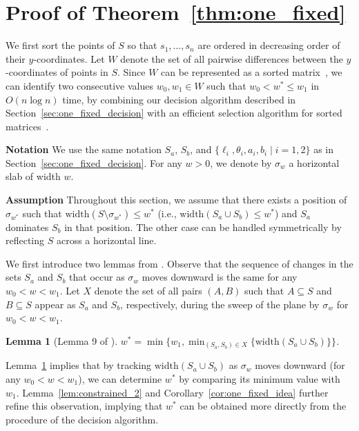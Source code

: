 \documentclass[10pt,a4paper]{article}
\newtheorem{lemma}[theorem]{Lemma}
\theoremstyle{star}
\theoremstyle{claimstar}
\newcommand{\width}{\ensuremath{\mathrm{width}}}
\begin{document}
\section{Proof of Theorem~\ref{thm:one_fixed}}
\label{sec:one_fixed_appendix}



We first sort the points of $S$ so that $s_1, \ldots, s_n$ are ordered in decreasing order of their $y$-coordinates.
Let $W$ denote the set of all pairwise differences between the $y$-coordinates of points in $S$.
Since $W$ can be represented as a sorted matrix~\cite{frederickson1982complexity}, we can identify two consecutive values $w_0, w_1 \in W$ such that $w_0 < w^* \le w_1$ in $O(n \log n)$ time, by combining our decision algorithm described in Section~\ref{sec:one_fixed_decision} with an efficient selection algorithm for sorted matrices~\cite{frederickson1984generalized}.

\textbf{Notation} We use the same notation $S_a$, $S_b$, and $\{\ell_i, \theta_i, a_i, b_i \mid i = 1, 2\}$ as in Section~\ref{sec:one_fixed_decision}.
For any $w > 0$, we denote by $\sigma_w$ a horizontal slab of width $w$.

\textbf{Assumption}
Throughout this section, we assume that there exists a position of $\sigma_{w^*}$ such that $\width(S \setminus \sigma_{w^*}) \le w^*$  (i.e., $\width(S_a\cup S_b) \le w^*$) and $S_a$ dominates $S_b$ in that position.
The other case can be handled symmetrically by reflecting $S$ across a horizontal line.

We first introduce two lemmas from \cite{ahn2024constrained}.
Observe that the sequence of changes in the sets $S_a$ and $S_b$ that occur as $\sigma_w$ moves downward is the same for any $w_0 < w < w_1$.
Let $X$ denote the set of all pairs $(A, B)$ such that $A \subseteq S$ and $B \subseteq S$ appear as $S_a$ and $S_b$, respectively, during the sweep of the plane by $\sigma_w$ for $w_0 < w < w_1$.


\begin{lemma}[Lemma 9 of \cite{ahn2024constrained}]
    \label{lem:constrained_1}
    $w^* = \min \{w_1,  \min_{(S_a, S_b) \in X} \{\width(S_a\cup S_b) \}\}$.
\end{lemma}

Lemma~\ref{lem:constrained_1} implies that by tracking $\width(S_a \cup S_b)$ as $\sigma_w$ moves downward (for any $w_0 < w < w_1$), we can determine $w^*$ by comparing its minimum value with $w_1$.
Lemma~\ref{lem:constrained_2} and Corollary~\ref{cor:one_fixed_idea} further refine this observation, implying that $w^*$ can be obtained more directly from the procedure of the decision algorithm.
\end{document}
